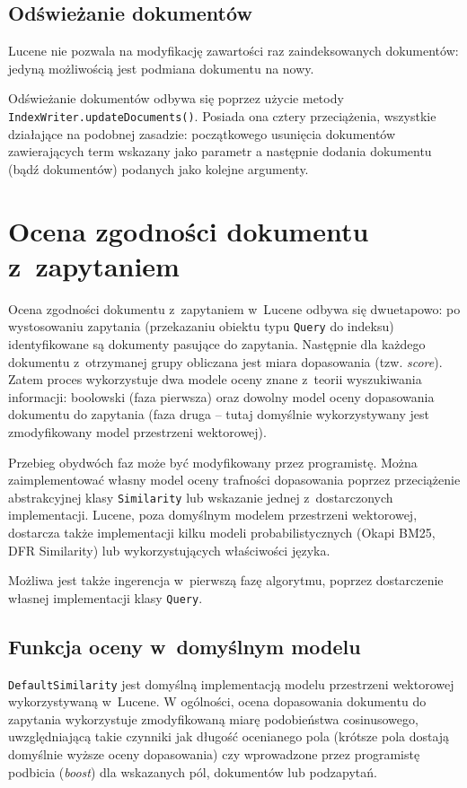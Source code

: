 \subsection{Odświeżanie dokumentów}

Lucene nie pozwala na modyfikację zawartości raz zaindeksowanych dokumentów: jedyną możliwością jest podmiana dokumentu na nowy.

Odświeżanie dokumentów odbywa się poprzez użycie metody \texttt{IndexWriter.updateDocuments()}. Posiada ona cztery przeciążenia, wszystkie działające na podobnej zasadzie: początkowego usunięcia dokumentów zawierających term wskazany jako parametr a następnie dodania dokumentu (bądź dokumentów) podanych jako kolejne argumenty. 

\section{Ocena zgodności dokumentu z~zapytaniem}

Ocena zgodności dokumentu z~zapytaniem w~Lucene odbywa się dwuetapowo: po wystosowaniu zapytania (przekazaniu obiektu typu \texttt{Query} do indeksu) identyfikowane są dokumenty pasujące do zapytania. Następnie dla każdego dokumentu z~otrzymanej grupy obliczana jest miara dopasowania (tzw. \emph{score}). Zatem proces wykorzystuje dwa modele oceny znane z~teorii wyszukiwania informacji: boolowski (faza pierwsza) oraz dowolny model oceny dopasowania dokumentu do zapytania (faza druga -- tutaj domyślnie wykorzystywany jest zmodyfikowany model przestrzeni wektorowej). 

Przebieg obydwóch faz może być modyfikowany przez programistę. Można zaimplementować własny model oceny trafności dopasowania poprzez przeciążenie abstrakcyjnej klasy \texttt{Similarity} lub wskazanie jednej z~dostarczonych implementacji. Lucene, poza domyślnym modelem przestrzeni wektorowej, dostarcza także implementacji kilku modeli probabilistycznych (Okapi BM25, DFR Similarity) lub wykorzystujących właściwości języka.

Możliwa jest także ingerencja w~pierwszą fazę algorytmu, poprzez dostarczenie własnej implementacji klasy \texttt{Query}.

\subsection{Funkcja oceny w~domyślnym modelu}

\texttt{DefaultSimilarity} jest domyślną implementacją modelu przestrzeni wektorowej wykorzystywaną w~Lucene. W ogólności, ocena dopasowania dokumentu do zapytania wykorzystuje zmodyfikowaną miarę podobieństwa cosinusowego, uwzględniającą takie czynniki jak długość ocenianego pola (krótsze pola dostają domyślnie wyższe oceny dopasowania) czy wprowadzone przez programistę podbicia (\emph{boost}) dla wskazanych pól, dokumentów lub podzapytań.

